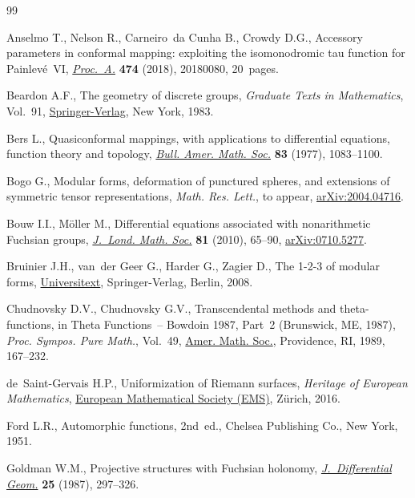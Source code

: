 \documentclass[pdftex]{sigma}
\numberwithin{equation}{section}
\begin{document}
\begin{thebibliography}{99}
\footnotesize\itemsep=0pt

Anselmo T., Nelson R., Carneiro~da Cunha B., Crowdy D.G., Accessory parameters
 in conformal mapping: exploiting the isomonodromic tau function for
 {P}ainlev\'e~{VI}, \href{https://doi.org/10.1098/rspa.2018.0080}{\textit{Proc.~A.}} \textbf{474} (2018), 20180080, 20~pages.

Beardon A.F., The geometry of discrete groups, \textit{Graduate Texts in
 Mathematics}, Vol.~91, \href{https://doi.org/10.1007/978-1-4612-1146-4}{Springer-Verlag}, New York, 1983.

Bers L., Quasiconformal mappings, with applications to differential equations,
 function theory and topology, \href{https://doi.org/10.1090/S0002-9904-1977-14390-5}{\textit{Bull. Amer. Math. Soc.}} \textbf{83}
 (1977), 1083--1100.

Bogo G., Modular forms, deformation of punctured spheres, and extensions of
 symmetric tensor representations, \textit{Math. Res. Lett.}, {t}o appear,
 \href{https://arxiv.org/abs/#2}{arXiv:2004.04716}.

Bouw I.I., M\"oller M., Differential equations associated with nonarithmetic
 {F}uchsian groups, \href{https://doi.org/10.1112/jlms/jdp059}{\textit{J.~Lond. Math. Soc.}} \textbf{81} (2010), 65--90,
 \href{https://arxiv.org/abs/0710.5277}{arXiv:0710.5277}.

Bruinier J.H., van~der Geer G., Harder G., Zagier D., The 1-2-3 of modular
 forms, \href{https://doi.org/10.1007/978-3-540-74119-0}{Universitext}, Springer-Verlag, Berlin, 2008.

Chudnovsky D.V., Chudnovsky G.V., Transcendental methods and theta-functions,
 in Theta Functions~-- {B}owdoin 1987, {P}art~2 ({B}runswick, {ME}, 1987),
 \textit{Proc. Sympos. Pure Math.}, Vol.~49, \href{https://doi.org/10.1103/physrevb.40.2946}{Amer. Math. Soc.}, Providence, RI,
 1989, 167--232.

de~Saint-Gervais H.P., Uniformization of {R}iemann surfaces, \textit{Heritage of
 European Mathematics}, \href{https://doi.org/10.4171/145}{European Mathematical Society (EMS)}, Z\"urich, 2016.

Ford L.R., Automorphic functions, 2nd~ed., Chelsea Publishing Co., New York,
 1951.

Goldman W.M., Projective structures with {F}uchsian holonomy,
 \href{https://doi.org/10.4310/jdg/1214440978}{\textit{J.~Differential Geom.}} \textbf{25} (1987), 297--326.


\end{thebibliography}
\end{document}
